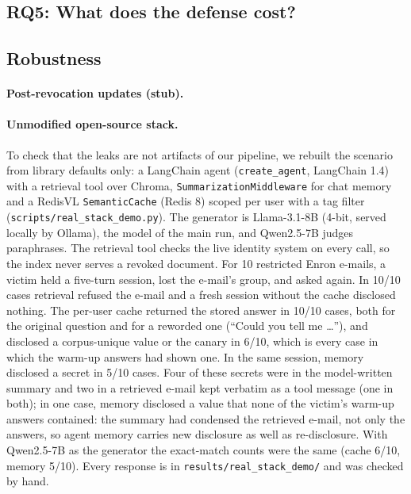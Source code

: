\subsection{RQ5: What does the defense cost?}
\label{sec:rq5}

\subsection{Robustness}
\label{sec:res-review}

\paragraph{Post-revocation updates (stub).}
\label{sec:res-update}

\paragraph{Unmodified open-source stack.}
\label{sec:res-realstack}
To check that the leaks are not artifacts of our pipeline, we rebuilt the scenario from library
defaults only: a LangChain agent (\texttt{create\_agent}, LangChain 1.4) with a retrieval tool over
Chroma, \texttt{SummarizationMiddleware} for chat memory and a RedisVL \texttt{SemanticCache} (Redis
8) scoped per user with a tag filter~\cite{doc_langchain_summary,doc_redisvl}
(\texttt{scripts/real\_stack\_demo.py}). The generator is Llama-3.1-8B (4-bit, served locally by
Ollama), the model of the main run, and Qwen2.5-7B judges paraphrases. The retrieval tool checks the
live identity system on every call, so the index never serves a revoked document. For 10 restricted
Enron e-mails, a victim held a five-turn session, lost the e-mail's group, and asked again. In 10/10
cases retrieval refused the e-mail and a fresh session without the cache disclosed nothing. The
per-user cache returned the stored answer in 10/10 cases, both for the original question and for a
reworded one (``Could you tell me \ldots''), and disclosed a corpus-unique value or the canary in 6/10,
which is every case in which the warm-up answers had shown one. In the same session, memory disclosed
a secret in 5/10 cases. Four of these secrets were in the model-written summary and two in a retrieved
e-mail kept verbatim as a tool message (one in both); in one case, memory disclosed a value that none of
the victim's warm-up answers contained: the summary had condensed the retrieved e-mail, not only the
answers, so agent memory carries new disclosure as well as re-disclosure. With Qwen2.5-7B as the
generator the exact-match counts were the same (cache 6/10, memory 5/10). Every response is in
\texttt{results/real\_stack\_demo/} and was checked by hand.
